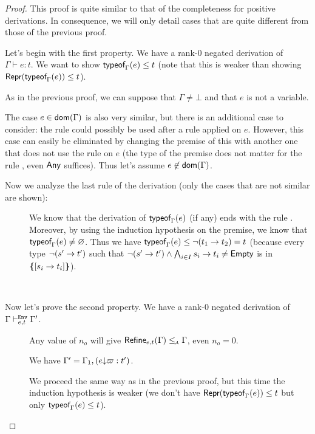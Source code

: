 \documentclass[a4paper]{article}
\theoremstyle{definition}
\begin{document}
  \begin{proof}
    This proof is quite similar to that of the completeness for positive derivations.
    In consequence, we will only detail cases that are quite different from those of the previous proof.

    Let's begin with the first property. We have a rank-0 negated derivation of $\Gamma \vdash e:t$.
    We want to show $\textsf{typeof}_{\Gamma}(e) \leq t$ (note that this is weaker than showing $\textsf{Repr}(\textsf{typeof}_{\Gamma}(e)) \leq t$).

    As in the previous proof, we can suppose that $\Gamma \neq \bot$ and that $e$ is not a variable.

    The case $e\in\textsf{dom}(\Gamma)$ is also very similar, but there is an additional case to consider:
    the rule  could possibly be used after a rule  applied on $e$.
    However, this case can easily be eliminated by changing the premise of this  with another one
    that does not use the rule  on $e$ (the type of the premise does not matter for the rule ,
    even $\textsf{Any}$ suffices). Thus let's assume $e\not\in\textsf{dom}(\Gamma)$.

    Now we analyze the last rule of the derivation (only the cases that are not similar are shown):
    \begin{description}
      \item[] We know that the derivation of $\textsf{typeof}_{\Gamma}(e)$ (if any) ends with the rule .
      Moreover, by using the induction hypothesis on the premise, we know that $\textsf{typeof}_{\Gamma}(e) \neq \varnothing$.
      Thus we have $\textsf{typeof}_{\Gamma}(e) \leq \neg (t_1\to t_2) = t$ (because every type $\neg (s'\to t')$
      such that $\neg (s'\to t') \land \bigwedge_{i\in I} s_i\to t_i \neq \textsf{Empty}$ is in $\textbf{\textup{\{}}{[}s_i\to t_i]\textbf{\textup{\}}}$).
    \end{description}

    \ 

    Now let's prove the second property. We have a rank-0 negated derivation of $\Gamma \vdash^{\texttt{Env}}_{e,t} \Gamma'$.

    \begin{description}
      \item[] Any value of $n_o$ will give $\textsf{Refine}_{e,t}(\Gamma) \leq_{\!\scriptscriptstyle\mathcal{A}} \Gamma$, even $n_o = 0$.
      \item[] We have $\Gamma' = \Gamma_1,(e{\downarrow}\varpi:t')$.
       
      We proceed the same way as in the previous proof, but this time the induction hypothesis is weaker
      (we don't have $\textsf{Repr}(\textsf{typeof}_{\Gamma}(e)) \leq t$ but only $\textsf{typeof}_{\Gamma}(e) \leq t$).
      

\end{description}
\end{proof}
\end{document}
